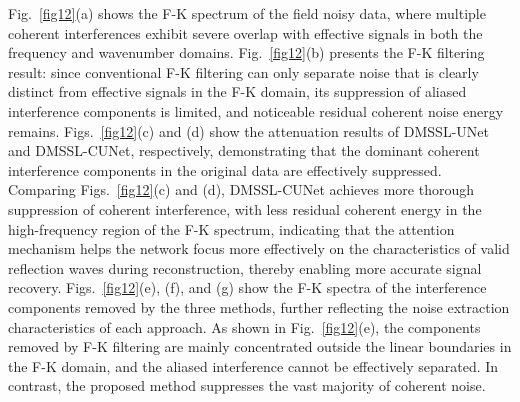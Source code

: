 \documentclass[a4paper,fleqn]{cas-dc}
\begin{document}
Fig.~\ref{fig12}(a) shows the F-K spectrum of the field noisy data, where multiple 
coherent interferences exhibit severe overlap with effective signals in both the frequency 
and wavenumber domains. Fig.~\ref{fig12}(b) presents the F-K filtering result: since 
conventional F-K filtering can only separate noise that is clearly distinct from effective 
signals in the F-K domain, its suppression of aliased interference components is limited, 
and noticeable residual coherent noise energy remains. Figs.~\ref{fig12}(c) and (d) 
show the attenuation results of DMSSL-UNet and DMSSL-CUNet, respectively, demonstrating 
that the dominant coherent interference components in the original data are effectively 
suppressed. Comparing Figs.~\ref{fig12}(c) and (d), DMSSL-CUNet achieves more 
thorough suppression of coherent interference, with less residual coherent energy in the 
high-frequency region of the F-K spectrum, indicating that the attention mechanism helps 
the network focus more effectively on the characteristics of valid reflection waves during 
reconstruction, thereby enabling more accurate signal recovery. 
Figs.~\ref{fig12}(e), (f), and (g) show the F-K spectra of the interference 
components removed by the three methods, further reflecting the noise extraction 
characteristics of each approach. As shown in Fig.~\ref{fig12}(e), the components 
removed by F-K filtering are mainly concentrated outside the linear boundaries in the F-K 
domain, and the aliased interference cannot be effectively separated. In contrast, the 
proposed method suppresses the vast majority of coherent noise.
\end{document}
